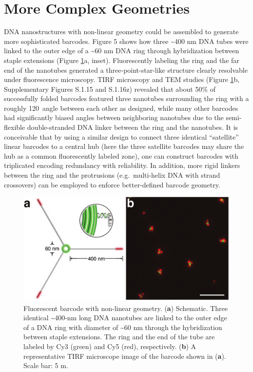 \section{More Complex Geometries}
DNA nanostructures with non-linear geometry could be assembled to generate 
more sophisticated barcodes. Figure 5 shows how three \textasciitilde400 nm DNA 
tubes were linked to the outer edge of a \textasciitilde60 nm DNA ring through hybridization between 
 staple extensions (Figure \ref{fig:dna5}a, inset). Fluorescently labeling the ring and the far end of 
the nanotubes generated a three-point-star-like structure clearly resolvable under 
fluorescence microscopy. TIRF microscopy and TEM studies (Figure \ref{fig:dna5}b, Supplementary Figures S.1.15 and S.1.16z) revealed that about 50\% of successfully folded barcodes featured three nanotubes 
surrounding the ring with a roughly 120\textdegree~angle between each other as designed, while 
many other barcodes had significantly biased angles between neighboring nanotubes due 
to the semi-flexible double-stranded DNA linker between the ring and the nanotubes. It is 
conceivable that by using a similar design to connect three identical ``satellite'' linear barcodes 
to a central hub (here the three satellite barcodes may share the hub as a common 
fluorescently labeled zone), one can construct barcodes with triplicated encoding 
redundancy with reliability. In addition, more rigid linkers between 
the ring and the protrusions (e.g.~multi-helix DNA with strand crossovers) can be 
employed to enforce better-defined barcode geometry. 


\begin{figure} %
\includegraphics[width=\textwidth]{figures/dna5}
\caption[Fluorescent barcode with non-linear geometry.]{Fluorescent barcode with non-linear geometry. (\textbf{a}) Schematic. Three identical 
\textasciitilde400-nm long DNA nanotubes are linked to the outer edge of a DNA ring with diameter 
of \textasciitilde60 nm through the hybridization between staple extensions. The ring and the end of 
the tube are labeled by Cy3 (green) and Cy5 (red), respectively. (\textbf{b}) A representative 
TIRF microscope image of the barcode shown in (\textbf{a}). Scale bar: 5 \textmu m. 
\label{fig:dna5}}
\end{figure}



